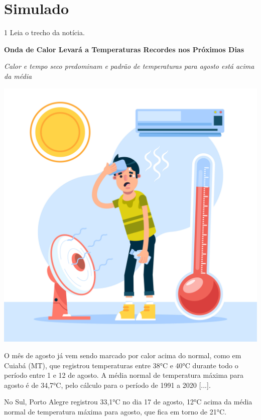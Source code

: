 
\setcounter{chapter}{0}
\chapter[Simulado 1]{Simulado}

\num{1} Leia o trecho da notícia.

\begin{myquote}
\textbf{Onda de Calor Levará a Temperaturas Recordes nos Próximos Dias}

\textit{Calor e tempo seco predominam e padrão de temperaturas para agosto está acima da média}

\begin{center}
\includegraphics[width=.6\textwidth]{media/image36b.jpeg}
\end{center}

O mês de agosto já vem sendo marcado por calor acima do normal, como em Cuiabá (MT), que registrou temperaturas entre 38°C e 40°C durante todo o período entre 1 e 12 de agosto. A média normal de temperatura máxima para agosto é de 34,7°C, pelo cálculo para o período de 1991 a 2020 [...].

No Sul, Porto Alegre registrou 33,1°C no dia 17 de agosto, 12°C acima da média normal de temperatura máxima para agosto, que fica em torno de 21°C.

\end{myquote}


